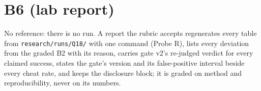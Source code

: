 \documentclass[11pt]{article}
\begin{document}
\section*{B6 (lab report)}
No reference: there is no run. A report the rubric accepts regenerates every
table from \texttt{research/runs/Q18/} with one command (Probe R), lists every
deviation from the graded B2 with its reason, carries gate v2's re-judged
verdict for every claimed success, states the gate's version and its
false-positive interval beside every cheat rate, and keeps the disclosure
block; it is graded on method and reproducibility, never on its numbers.
\end{document}
